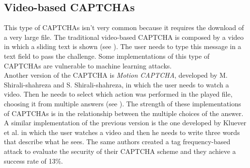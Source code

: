 \subsection{Video-based CAPTCHAs}
This type of CAPTCHAs isn't very common because it requires the download of a very large file\cite{survey_advanced_CAPTCHA}. The traditional video-based CAPTCHA is composed by a video in which a sliding text is shown (see ). The user needs to type this message in a text field to pass the challenge. Some implementations of this type of CAPTCHAs are vulnerable to machine learning attacks.\\
Another version of the CAPTCHA is \textit{Motion CAPTCHA}\cite{Motion_CAPTCHA}, developed by M. Shirali-shahreza and S. Shirali-shahreza, in which the user needs to watch a video. Then he needs to select which action was performed in the played file, choosing it from multiple answers (see ). The strength of these implementations of CAPTCHAs is in the relationship between the multiple choices of the answer\cite{video_attack}.\\
A similar implementation of the previous version is the one developed by Kluever et al. in which the user watches a video and then he needs to write three words that describe what he sees\cite{video_desc}. The same authors created a tag frequency-based attack to evaluate the security of their CAPTCHA scheme and they achieve a success rate of 13\%.
